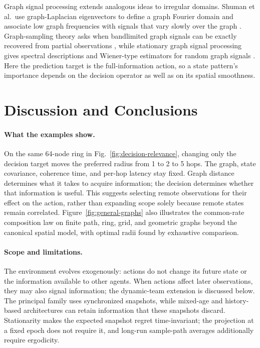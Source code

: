 \documentclass[11pt]{article}
\begin{document}
Graph signal processing extends analogous ideas to irregular domains. Shuman et al.\ use graph-Laplacian eigenvectors to define a graph Fourier domain and associate low graph frequencies with signals that vary slowly over the graph \cite{shuman2013emerging}. Graph-sampling theory asks when bandlimited graph signals can be exactly recovered from partial observations \cite{chen2015discrete}, while stationary graph signal processing gives spectral descriptions and Wiener-type estimators for random graph signals \cite{perraudin2017stationary}. Here the prediction target is the full-information action, so a state pattern's
importance depends on the decision operator as well as on its spatial smoothness.

\section{Discussion and Conclusions}
\label{sec:discussion_conclusions}

\paragraph{What the examples show.}
On the same 64-node ring in Fig.~\ref{fig:decision-relevance}, changing only
the decision target moves the preferred radius from 1 to 2 to 5 hops.
The graph, state covariance, coherence time, and per-hop latency stay fixed.
Graph distance determines what it takes to acquire information; the decision
determines whether that information is useful. This suggests selecting remote
observations for their effect on the action, rather than expanding scope
solely because remote states remain correlated.
Figure~\ref{fig:general-graphs} also illustrates the common-rate composition
law on finite path, ring, grid, and geometric graphs beyond the canonical
spatial model, with optimal radii found by exhaustive comparison.

\paragraph{Scope and limitations.}
The environment evolves exogenously: actions do not change its future state
or the information available to other agents. When actions affect later
observations, they may also signal information;
the dynamic-team extension is discussed below. The principal family uses
synchronized snapshots, while mixed-age and history-based architectures can
retain information that these snapshots discard. Stationarity makes the
expected snapshot regret time-invariant; the projection at a fixed epoch does
not require it, and long-run sample-path averages additionally require ergodicity.
\end{document}
